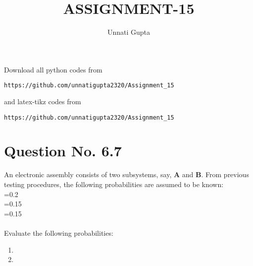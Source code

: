 \documentclass[journal,12pt,twocolumn]{IEEEtran}
\begin{document}
     \def\centbox#1{\makebox[0in]{#1}}
     \def\topbox#1{\raisebox{-\baselineskip}[0in][0in]{#1}}
     \def\midbox#1{\raisebox{-0.5\baselineskip}[0in][0in]{#1}}
\vspace{3cm}
\title{ASSIGNMENT-15}
\author{Unnati Gupta}
\maketitle
\newpage
\bigskip
\renewcommand{\thefigure}{\theenumi}
\renewcommand{\thetable}{\theenumi}
Download all python codes from 
\begin{lstlisting}
https://github.com/unnatigupta2320/Assignment_15
\end{lstlisting}
%
and latex-tikz codes from 
%
\begin{lstlisting}
https://github.com/unnatigupta2320/Assignment_15
\end{lstlisting}
%
\section{Question No. 6.7}
An electronic assembly consists of two subsystems, say, \textbf{A} and \textbf{B}. From previous testing procedures, the following probabilities are assumed to be known:\\
=0.2\\
=0.15\\
=0.15
\\
\\
Evaluate the following probabilities:
\begin{enumerate}[label=\roman*)]
    \item {}
    \item {}
\end{enumerate}
\end{document}
